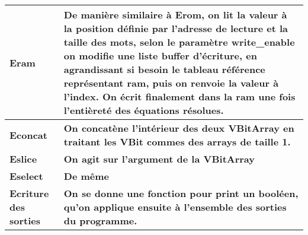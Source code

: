 \documentclass[12pt]{article}
\begin{document}
\begin{longtable}{>{\bfseries\color{ulmj}}p{6cm}>{\bfseries\color{ulmj}}p{8cm}}
        \midrule
        \textmd{Eram} & De manière similaire à \textmd{Erom}, on lit la valeur à la position définie par l'adresse de lecture et la taille des mots, selon le paramètre \textmd{write\_enable} on modifie une liste buffer d'écriture, en agrandissant si besoin le tableau référence représentant \textmd{ram}, puis on renvoie la valeur à l'index. On écrit finalement dans la ram une fois l'entièreté des équations résolues.\\
        \midrule
        \textmd{Econcat} & On concatène l'intérieur des deux \textmd{VBitArray} en traitant les \textmd{VBit} commes des arrays de taille 1.\\
        \midrule
        \textmd{Eslice} & On agit sur l'argument de la \textmd{VBitArray}\\
        \midrule
        \textmd{Eselect} & De même \\
        \midrule
        Ecriture des sorties & On se donne une fonction pour print un booléen, qu'on applique ensuite à l'ensemble des sorties du programme. 
        \\
        \bottomrule
    \end{longtable}
\end{document}
